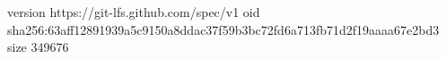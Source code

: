 version https://git-lfs.github.com/spec/v1
oid sha256:63aff12891939a5c9150a8ddac37f59b3bc72fd6a713fb71d2f19aaaa67e2bd3
size 349676
